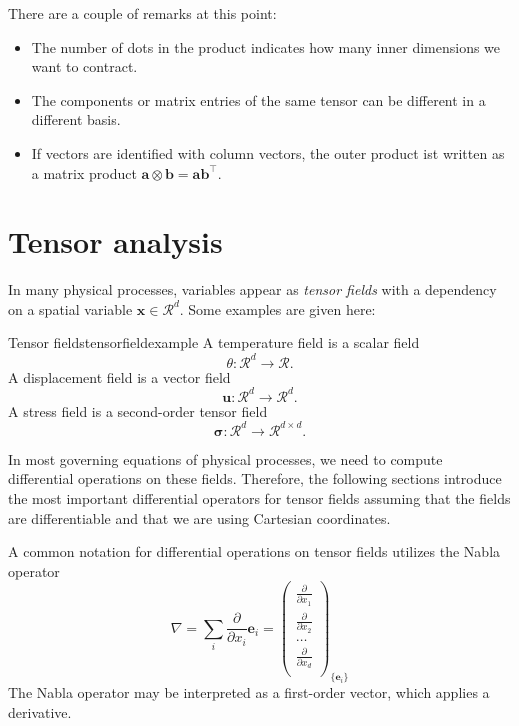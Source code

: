 There are a couple of remarks at this point:
\begin{itemize}
    \item The number of dots in the product indicates how many inner dimensions we want to contract.
    \item The components or matrix entries of the same tensor can be different in a different basis.
    \item If vectors are identified with column vectors, the outer product ist written as a matrix product $\mathbf{a} \otimes \mathbf{b} = \mathbf{a} \mathbf{b}^\top$.
\end{itemize}

\section{Tensor analysis}
In many physical processes, variables appear as \emph{tensor fields} with a dependency on a spatial variable $\mathbf{x} \in \mathcal{R}^d$. Some examples are given here:
\begin{example}{Tensor fields}{tensorfieldexample}
    A temperature field is a scalar field
    \begin{equation}
        \theta: \mathcal{R}^d \rightarrow \mathcal{R}.
    \end{equation}
    A displacement field is a vector field
    \begin{equation}
        \mathbf{u}: \mathcal{R}^d \rightarrow \mathcal{R}^d.
    \end{equation}
    A stress field is a second-order tensor field
    \begin{equation}
        \pmb{\sigma}: \mathcal{R}^d \rightarrow \mathcal{R}^{d \times d}.
    \end{equation}
\end{example}

In most governing equations of physical processes, we need to compute differential operations on these fields. Therefore, the following sections introduce the most important differential operators for tensor fields assuming that the fields are differentiable and that we are using Cartesian coordinates. 

A common notation for differential operations on tensor fields utilizes the Nabla operator 
\begin{equation}
    \nabla = \sum_i \frac{\partial }{\partial x_i} \mathbf{e}_i = 
    \begin{pmatrix}
            \frac{\partial}{\partial x_1} \\
            \frac{\partial}{\partial x_2} \\
            \dots \\
            \frac{\partial}{\partial x_d} \\
        \end{pmatrix}_{\{\mathbf{e}_i\}}
\end{equation}
The Nabla operator may be interpreted as a first-order vector, which applies a derivative. 

